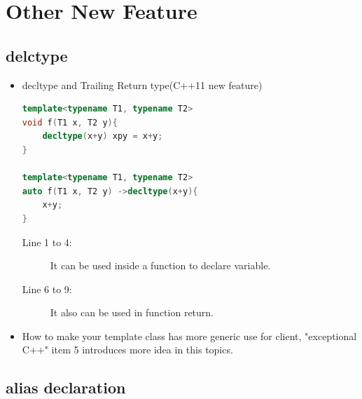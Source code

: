\documentclass[a4paper,11pt,twoside]{book}
\begin{document}
\section{Other New Feature}
\subsection{delctype}
\begin{itemize}

\item decltype and  Trailing Return type(C++11 new feature)
\begin{lstlisting}[frame=single, language=c++]
template<typename T1, typename T2>
void f(T1 x, T2 y){
	decltype(x+y) xpy = x+y;
}

template<typename T1, typename T2>
auto f(T1 x, T2 y) ->decltype(x+y){
	x+y;
}
\end{lstlisting}
\begin{description}
	\item[Line 1 to 4:] It can be used inside a function to declare variable.
	\item[Line 6 to 9:] It also can be used in function return.
\end{description}

\item How to make your template class has more generic use for client, "exceptional C++" item 5 introduces more idea in this topics.

\end{itemize}


\subsection{alias declaration}
\end{document}
